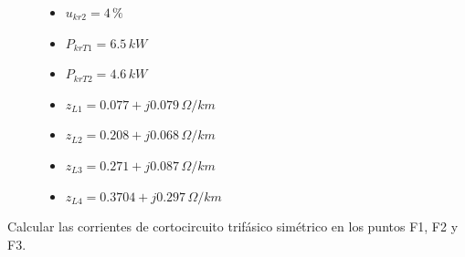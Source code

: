 \begin{figure}[H]
\begin{minipage}{0.2\textwidth}
\begin{itemize}
                        \item $u_\textit{kr2} = 4\,\text{\%}$
                        \item $P_\textit{krT1} = 6.5\,\textit{kW}$
                        \item $P_\textit{krT2} = 4.6\,\textit{kW}$
                    \end{itemize}
                \end{minipage}%
                \begin{minipage}{0.2\textwidth}
                    \begin{itemize}
                        \item $z_\textit{L1} = 0.077+j0.079\,\varOmega/\textit{km}$
                        \item $z_\textit{L2} = 0.208+j0.068\,\varOmega/\textit{km}$
                        \item $z_\textit{L3} = 0.271+j0.087\,\varOmega/\textit{km}$
                        \item $z_\textit{L4} = 0.3704+j0.297\,\varOmega/\textit{km}$
                    \end{itemize}
                \end{minipage}
            \end{figure}

            Calcular las corrientes de cortocircuito trifásico simétrico en los puntos F1, F2 y F3.

